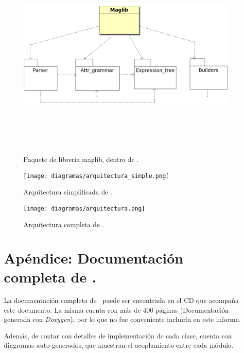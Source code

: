 \begin{figure}[!ht]\centering
\includegraphics[width=635pt, height=300pt, angle=90]{diagramas/maggen.png}
\caption{\label{fig:dia-maglib}Paquete de libreria maglib, dentro de \maggen.}
\end{figure}

\begin{figure}[!ht]\centering
\texttt{[image: diagramas/arquitectura\_simple.png]}
\caption{\label{fig:arquitec-full}Arquitectura simplificada de \maggen.}
\end{figure}

\begin{figure}[!ht]\centering
\texttt{[image: diagramas/arquitectura.png]}
\caption{\label{fig:arquitec-full}Arquitectura completa de \maggen.}
\end{figure}



\chapter{Apéndice: Documentación completa de \maggen.}
\label{chap:appendix-doxy}
La documentación completa de \maggen\ puede ser encontrada en el CD que acompaña este documento. La misma cuenta con más de 400 páginas (Documentación generada con \textit{Doxygen}), por lo que no fue conveniente incluirla en este informe. 

Además, de contar con detalles de implementación de cada clase, cuenta con diagramas auto-generados, que muestran el acoplamiento entre cada módulo.

